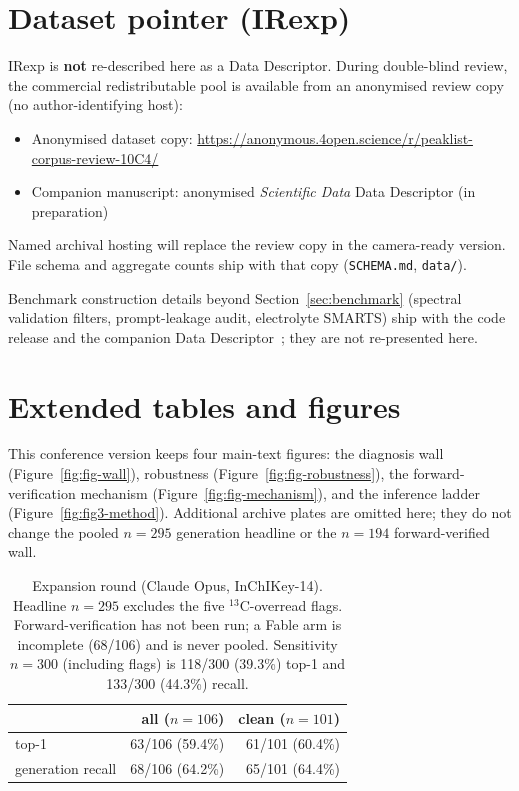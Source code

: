 \documentclass{article}
\begin{document}
\appendix

\section{Dataset pointer (IRexp)}
\label{app:dataset}

IRexp is \textbf{not} re-described here as a Data Descriptor.
During double-blind review, the commercial redistributable pool is available from an anonymised review copy (no author-identifying host):
\begin{itemize}
  \item Anonymised dataset copy: \url{https://anonymous.4open.science/r/peaklist-corpus-review-10C4/}
  \item Companion manuscript: anonymised \textit{Scientific Data} Data Descriptor (in preparation)~\citep{yabbarov2026irexp}
\end{itemize}
Named archival hosting will replace the review copy in the camera-ready version.
File schema and aggregate counts ship with that copy (\texttt{SCHEMA.md}, \texttt{data/}).

Benchmark construction details beyond Section~\ref{sec:benchmark} (spectral validation
filters, prompt-leakage audit, electrolyte SMARTS) ship with the code release and the
companion Data Descriptor~\citep{yabbarov2026irexp}; they are not re-presented here.

\section{Extended tables and figures}

This conference version keeps four main-text figures: the diagnosis wall
(Figure~\ref{fig:fig-wall}), robustness (Figure~\ref{fig:fig-robustness}), the
forward-verification mechanism (Figure~\ref{fig:fig-mechanism}), and the inference
ladder (Figure~\ref{fig:fig3-method}).
Additional archive plates are omitted here; they do not change the pooled $n{=}295$
generation headline or the $n{=}194$ forward-verified wall.

\begin{table}[h]
\caption{Expansion round (Claude Opus, InChIKey-14). Headline $n{=}295$ excludes the five
$^{13}$C-overread flags. Forward-verification has not been run; a Fable arm is incomplete
(68/106) and is never pooled. Sensitivity $n{=}300$ (including flags) is 118/300 (39.3\%)
top-1 and 133/300 (44.3\%) recall.}
\label{tab:expansion}
\centering
\begin{tabular}{@{}lrr@{}}
\toprule
 & all ($n{=}106$) & clean ($n{=}101$) \\
\midrule
top-1 & 63/106 (59.4\%) & 61/101 (60.4\%) \\
generation recall & 68/106 (64.2\%) & 65/101 (64.4\%) \\
\bottomrule
\end{tabular}
\end{table}
\end{document}
